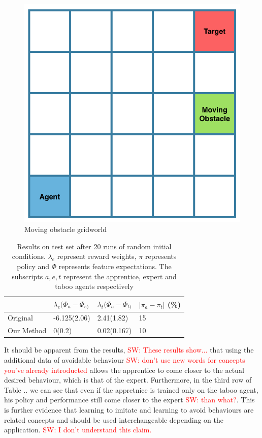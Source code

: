 \documentclass[letterpaper]{article}
\newcommand{\sw}[1]{\textcolor{red}{SW: #1}}
\begin{document}
\begin{figure}[t]
  \centering
  \includegraphics[width=0.5\columnwidth]{images/gridworld.png}
  \caption{Moving obstacle gridworld 	\label{fig:gridworld}}
\end{figure}
\begin{table}[]
\centering

\label{tab:results}
\begin{tabular}{|l|l|l|l|}
\hline
           & $\lambda_e(\Phi_{a}-\Phi_{e)}$& $\lambda_t(\Phi_{a}-\Phi_{t)}$ & $|\pi_a - \pi_t|$ (\%) \\ \hline
Original   & -6.125(2.06)        & 2.41(1.82)         & 15                    \\ \hline
Our Method & 0(0.2)              & 0.02(0.167)        & 10                    \\ \hline
\end{tabular}
\caption{Results on test set after 20 runs of random initial conditions. $\lambda_e$ represent reward weights, $\pi$ represents policy and $\Phi$ represents feature expectations. The subscripts $a,e,t$ represent the apprentice, expert and taboo agents respectively}
\end{table}
It should be apparent from the results, \sw{These results show...} that using the additional data of avoidable behaviour \sw{don't use new words for concepts you've already introducted} allows the apprentice to 
come closer to the actual desired behaviour, which is that of the expert. Furthermore, in the third row of Table .. we can see that
even if the appretnice is trained only on the taboo agent, his policy and performance still come closer to the expert \sw{than what?}. This is further
evidence that learning to imitate and learning to avoid behaviours are related concepts and should be used interchangeable depending on the application. \sw{I don't understand this claim.}
\end{document}
